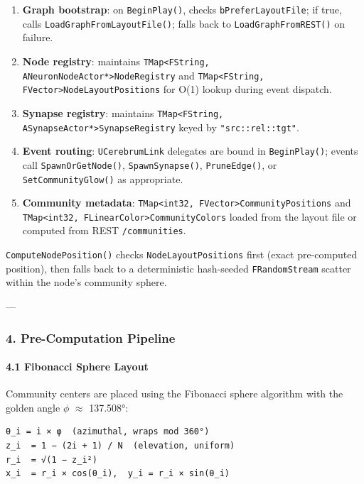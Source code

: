 \begin{enumerate}
\item \textbf{Graph bootstrap}: on \texttt{BeginPlay()}, checks \texttt{bPreferLayoutFile}; if true, calls \texttt{LoadGraphFromLayoutFile()}; falls back to \texttt{LoadGraphFromREST()} on failure.
\item \textbf{Node registry}: maintains \texttt{TMap\textless FString, ANeuronNodeActor*\textgreater  NodeRegistry} and \texttt{TMap\textless FString, FVector\textgreater  NodeLayoutPositions} for O(1) lookup during event dispatch.
\item \textbf{Synapse registry}: maintains \texttt{TMap\textless FString, ASynapseActor*\textgreater  SynapseRegistry} keyed by \texttt{"src::rel::tgt"}.
\item \textbf{Event routing}: \texttt{UCerebrumLink} delegates are bound in \texttt{BeginPlay()}; events call \texttt{SpawnOrGetNode()}, \texttt{SpawnSynapse()}, \texttt{PruneEdge()}, or \texttt{SetCommunityGlow()} as appropriate.
\item \textbf{Community metadata}: \texttt{TMap\textless int32, FVector\textgreater  CommunityPositions} and \texttt{TMap\textless int32, FLinearColor\textgreater  CommunityColors} loaded from the layout file or computed from REST \texttt{/communities}.

\end{enumerate}
\texttt{ComputeNodePosition()} checks \texttt{NodeLayoutPositions} first (exact pre-computed position), then falls back to a deter\-ministic hash-seeded \texttt{FRandomStream} scatter within the node's community sphere.

---

\subsubsection{4. Pre-Computation Pipeline}

\paragraph{4.1 Fibonacci Sphere Layout}

Community centers are placed using the Fibonacci sphere algorithm with the golden angle $\phi$ $\approx$ 137.508°:

\begin{lstlisting}
θ_i = i × φ  (azimuthal, wraps mod 360°)
z_i  = 1 − (2i + 1) / N  (elevation, uniform)
r_i  = √(1 − z_i²)
x_i  = r_i × cos(θ_i),  y_i = r_i × sin(θ_i)
\end{lstlisting}

